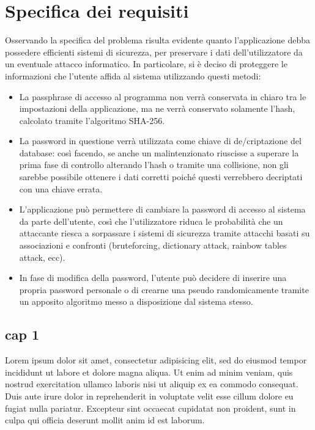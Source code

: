 \documentclass[a4paper,10pt]{report} %
\begin{document}
\chapter{Specifica dei requisiti} %
	Osservando la specifica del problema risulta evidente quanto l’applicazione
	debba possedere efficienti sistemi di sicurezza, per preservare i dati dell’utilizzatore
	da un eventuale attacco informatico.\vfill
	In particolare, si è deciso di proteggere le informazioni che l’utente affida
	al sistema utilizzando questi metodi:\vfill
	\begin{itemize}
			\item La passphrase di accesso al programma non verrà conservata in chiaro
				tra le impostazioni della applicazione, ma ne verrà conservato solamente l’hash,
				calcolato tramite l’algoritmo SHA-256.
			\item La password in questione verrà utilizzata come chiave di de/criptazione del database:
				così facendo, se anche un malintenzionato riuscisse a superare la prima fase di controllo
				alterando l’hash o tramite una collisione, non gli sarebbe possibile ottenere i dati corretti
				poiché questi verrebbero decriptati con una chiave errata.
			\item	L’applicazione può permettere di cambiare la password di accesso al sistema da parte dell’utente,
				così che l’utilizzatore riduca le probabilità che un attaccante riesca a sorpassare i
				sistemi di sicurezza tramite attacchi basati su associazioni e confronti
				(bruteforcing, dictionary attack, rainbow tables attack, ecc).
			\item	In fase di modifica della password, l’utente può decidere di inserire una
			propria password personale o di crearne una pseudo randomicamente tramite un
			apposito algoritmo messo a disposizione dal sistema stesso.
		\end{itemize}
  \section{cap 1}
    Lorem ipsum dolor sit amet, consectetur adipisicing elit, sed do eiusmod tempor incididunt ut labore et dolore magna aliqua. Ut enim ad minim veniam, quis nostrud exercitation ullamco laboris nisi ut aliquip ex ea commodo consequat. Duis aute irure dolor in reprehenderit in voluptate velit esse cillum dolore eu fugiat nulla pariatur. Excepteur sint occaecat cupidatat non proident, sunt in culpa qui officia deserunt mollit anim id est laborum.
\end{document}
